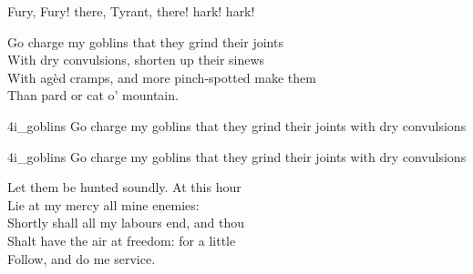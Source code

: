 





\begin{verse_speech}[Prospero] 
Fury, Fury! there, Tyrant, there! hark! hark!
	

Go charge my goblins that they grind their joints\\
With dry convulsions, shorten up their sinews\\
With agèd cramps, and more pinch-spotted make them\\
Than pard or cat o' mountain.
\end{verse_speech}


\begin{pictures} %
	\begin{letter}
		\begin{colorbigpic}
			[1.1]
			{4i_goblins}
			{Go charge my goblins that they grind their joints with dry convulsions}
		\end{colorbigpic}
	\end{letter}
	\begin{a4}
		\begin{colorbigpic}
			[1.1]
			{4i_goblins}
			{Go charge my goblins that they grind their joints with dry convulsions}
		\end{colorbigpic}
	\end{a4}
\end{pictures}

\begin{verse_speech}[Prospero] 
Let them be hunted soundly. At this hour\\
Lie at my mercy all mine enemies:\\
Shortly shall all my labours end, and thou\\
Shalt have the air at freedom: for a little\\
Follow, and do me service.
\end{verse_speech}

